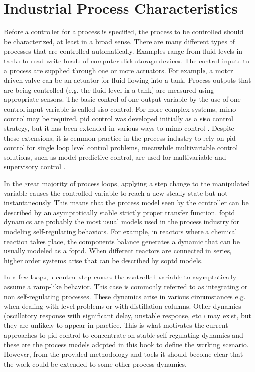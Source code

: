 \section{Industrial Process Characteristics}
\label{sec:2}
%
Before a controller for a process is specified, the process to be controlled should be characterized, at least in a broad sense. There are many different types of processes that are controlled automatically. Examples range from fluid levels in tanks to read-write heads of computer disk storage devices. The control inputs to a process are supplied through one or more actuators. For example, a motor driven valve can be an actuator for fluid flowing into a tank. Process outputs that are being controlled (e.g. the fluid level in a tank) are measured using appropriate sensors. The basic control of one output variable by the use of one control input variable is called \gls{siso} control. For more complex systems, \gls{mimo} control may be required. \gls{pid} control was developed initially as a \gls{siso} control strategy, but it has been extended in various ways to \gls{mimo} control \citep{wang2008}. Despite these extensions, it is common practice in the process industry to rely on \gls{pid} control for single loop level control problems, meanwhile multivariable control solutions, such as model predictive control, are used for multivariable and supervisory control \citep{VilanovaBook2012}.

In the great majority of process loops, applying a step change to the manipulated variable causes the controlled variable to reach a new steady state but not instantaneously. This means that the process model seen by the controller can be described by an asymptotically stable strictly proper transfer function. \gls{foptd} dynamics are probably the most usual models used in the process industry for modeling self-regulating behaviors. For example, in reactors where a chemical reaction takes place, the components balance generates a dynamic that can be usually modeled as a \gls{foptd}. When different reactors are connected in series, higher order systems arise that can be described by \gls{soptd} models. 

In a few loops, a control step causes the controlled variable to asymptotically assume a ramp-like behavior. This case is commonly referred to as integrating or non self-regulating processes. These dynamics arise in various circumstances e.g. when dealing with level problems or with distillation columns. Other dynamics (oscillatory response with significant delay, unstable response, etc.) may exist, but they are unlikely to appear in practice. This is what motivates the current approaches to \gls{pid} control to concentrate on stable self-regulating dynamics and these are the process models adopted in this book to define the working scenario. However, from the provided methodology and tools it should become clear that the work could be extended to some other process dynamics.

